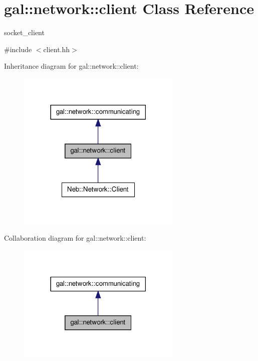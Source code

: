 \hypertarget{classgal_1_1network_1_1client}{\section{gal\-:\-:network\-:\-:client \-Class \-Reference}
\label{classgal_1_1network_1_1client}
}


socket\-\_\-client  




{\ttfamily \#include $<$client.\-hh$>$}



\-Inheritance diagram for gal\-:\-:network\-:\-:client\-:\nopagebreak
\begin{figure}[H]
\begin{center}
\leavevmode
\includegraphics[width=222pt]{classgal_1_1network_1_1client__inherit__graph}
\end{center}
\end{figure}


\-Collaboration diagram for gal\-:\-:network\-:\-:client\-:\nopagebreak
\begin{figure}[H]
\begin{center}
\leavevmode
\includegraphics[width=222pt]{classgal_1_1network_1_1client__coll__graph}
\end{center}
\end{figure}
